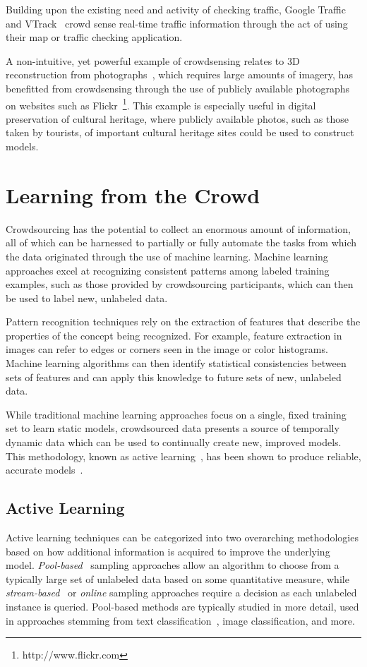 \documentclass[10pt,twocolumn]{article}
\begin{document}
Building upon the existing need and activity of checking
traffic, Google Traffic~\cite{GoogleTraffic} and VTrack~\cite{Thiagarajan2009}
crowd sense real-time traffic information through the act of
using their map or traffic checking application.

A non-intuitive, yet powerful example of crowdsensing relates
to 3D reconstruction from photographs~\cite{Agarwal2009,Frahm2010},
which requires large amounts of imagery, has benefitted from
crowdsensing through the use of publicly available photographs
on websites such as Flickr~\footnote{http://www.flickr.com}. This 
example is especially useful in digital preservation of cultural
heritage, where publicly available photos, such as those taken 
by tourists, of important cultural heritage sites could be used 
to construct models.


\section{Learning from the Crowd}
\label{sec:learning}
Crowdsourcing has the potential to collect an enormous amount of
information, all of which can be harnessed to partially or fully 
automate the tasks from which the data originated through the use of 
machine learning. Machine learning approaches excel at recognizing
consistent patterns among labeled training examples, such as those
provided by crowdsourcing participants, which can then be used to 
label new, unlabeled data.

Pattern recognition techniques rely on the extraction of features
that describe the properties of the concept being recognized. For
example, feature extraction in images can refer to edges or corners 
seen in the image or color histograms. Machine learning algorithms
can then identify statistical consistencies between sets of
features and can apply this knowledge to future sets of new,
unlabeled data.

While traditional machine learning approaches focus on a single,
fixed training set to learn static models, crowdsourced data presents
a source of temporally dynamic data which can be used to continually
create new, improved models. This methodology, known as active 
learning~\cite{Druck2009,Settles2010}, has been shown to produce reliable,
accurate models~\cite{Barrington2012,Brew2010}.


\subsection{Active Learning}
Active learning techniques can be categorized into two overarching 
methodologies based on how additional information is acquired to 
improve the underlying model. \textit{Pool-based}~\cite{McCallum1998} 
sampling approaches allow an algorithm to choose from a typically large set
of unlabeled data based on some quantitative measure, while 
\textit{stream-based}~\cite{Freund1997} or \textit{online} sampling approaches 
require a decision as each unlabeled instance is queried. Pool-based methods 
are typically studied in more detail, used in approaches stemming from text
classification~\cite{Lewis1994,Yan2011}, image classification, and more.
\end{document}

